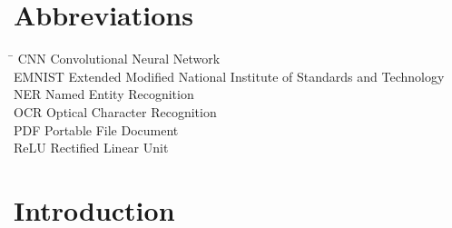 


\chapter*{Abbreviations}
\begin{tabbing}
\hspace{50mm}\=\kill
CNN \>  Convolutional Neural Network \\
EMNIST \> Extended Modified National Institute of Standards and Technology\\
NER \> Named Entity Recognition\\
OCR \> Optical Character Recognition\\
PDF \> Portable File Document\\
ReLU \> Rectified Linear Unit\\
\end{tabbing}
\newpage
{}

\chapter{Introduction}
